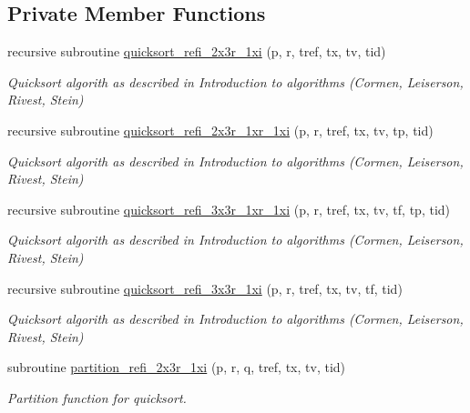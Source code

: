 \subsection*{Private Member Functions}
\begin{DoxyCompactItemize}
\item 
recursive subroutine \hyperlink{classmodsortinterf_a083e6e7591f58e1473c8d0027dec8811}{quicksort\-\_\-refi\-\_\-2x3r\-\_\-1xi} (p, r, tref, tx, tv, tid)
\begin{DoxyCompactList}\small\item\em Quicksort algorith as described in Introduction to algorithms (Cormen, Leiserson, Rivest, Stein) \end{DoxyCompactList}\item 
recursive subroutine \hyperlink{classmodsortinterf_a4a0d6eb151ffef0f10e55f3b4f6bbd4c}{quicksort\-\_\-refi\-\_\-2x3r\-\_\-1xr\-\_\-1xi} (p, r, tref, tx, tv, tp, tid)
\begin{DoxyCompactList}\small\item\em Quicksort algorith as described in Introduction to algorithms (Cormen, Leiserson, Rivest, Stein) \end{DoxyCompactList}\item 
recursive subroutine \hyperlink{classmodsortinterf_a84b8a8187e575b463e701c9660e060ed}{quicksort\-\_\-refi\-\_\-3x3r\-\_\-1xr\-\_\-1xi} (p, r, tref, tx, tv, tf, tp, tid)
\begin{DoxyCompactList}\small\item\em Quicksort algorith as described in Introduction to algorithms (Cormen, Leiserson, Rivest, Stein) \end{DoxyCompactList}\item 
recursive subroutine \hyperlink{classmodsortinterf_a4e2275566fd82541954638bda4797d5b}{quicksort\-\_\-refi\-\_\-3x3r\-\_\-1xi} (p, r, tref, tx, tv, tf, tid)
\begin{DoxyCompactList}\small\item\em Quicksort algorith as described in Introduction to algorithms (Cormen, Leiserson, Rivest, Stein) \end{DoxyCompactList}\item 
subroutine \hyperlink{classmodsortinterf_aa3bf097c9f86c18f8d7b4584b966c4b3}{partition\-\_\-refi\-\_\-2x3r\-\_\-1xi} (p, r, q, tref, tx, tv, tid)
\begin{DoxyCompactList}\small\item\em Partition function for quicksort. \end{DoxyCompactList}\item 

\end{DoxyCompactItemize}
